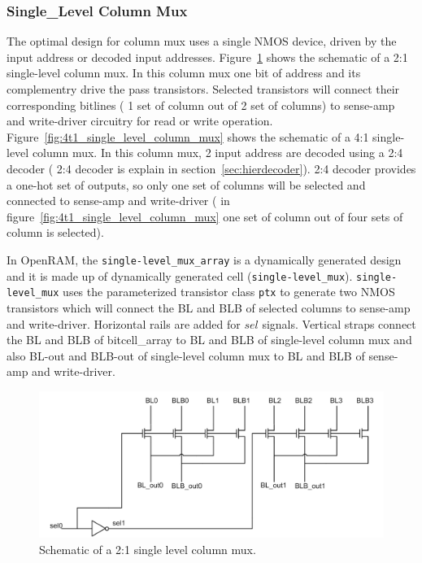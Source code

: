 \subsubsection{Single\_Level Column Mux}
\label{sec:single_level_column_mux}

The optimal design for column mux uses a single NMOS device, driven by the input address or decoded input addresses.
Figure~\ref{fig:2t1_single_level_column_mux} shows the schematic of a 2:1 single-level column mux. In this column mux one bit 
of address and its complementry drive the pass transistors. Selected transistors will  
connect their corresponding bitlines ( 1 set of column out of 2 set of columns) to sense-amp and write-driver circuitry for read or write operation. 
Figure~\ref{fig:4t1_single_level_column_mux} shows the schematic of a 4:1 single-level column mux. In this column mux, 2 input 
address are decoded using a 2:4 decoder ( 2:4 decoder is explain in section~\ref{sec:hierdecoder}). 2:4 decoder provides a one-hot set of outputs, so only one set of columns 
will be selected and connected to sense-amp and write-driver
( in figure~\ref{fig:4t1_single_level_column_mux} one set of column out of four sets of column is selected).

In OpenRAM, the \verb|single-level_mux_array| is a dynamically generated design and 
it is made up of dynamically generated cell (\verb|single-level_mux|).
\verb|single-level_mux| uses the parameterized transistor class \verb|ptx| to generate two NMOS transistors 
which will connect the BL and BLB of selected columns to sense-amp and write-driver. Horizontal rails are added for $sel$ signals. Vertical   
straps connect the BL and BLB of bitcell\_array to BL and BLB of single-level column mux and also BL-out and BLB-out of single-level 
column mux to BL and BLB of sense-amp and write-driver.


\begin{figure}[h!]
\centering
\includegraphics[scale=.7]{./figs/2t1_single_level_column_mux.pdf}
\caption{Schematic of a 2:1 single level column mux.}
\label{fig:2t1_single_level_column_mux}
\end{figure}



